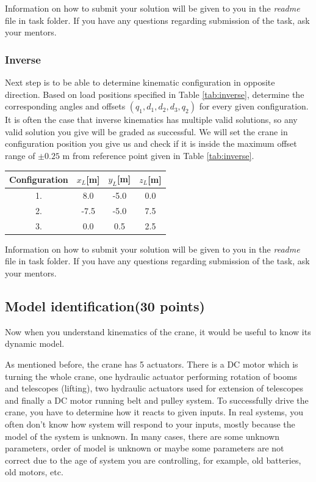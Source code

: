 \documentclass{article}
\begin{document}
	\noindent
	Information on how to submit your solution will be given to you in the \textit{readme} file in task folder. If you have any questions regarding submission of the task, ask your mentors.
	
	\subsubsection{Inverse}
	
	Next step is to be able to determine kinematic configuration in opposite direction. Based on load positions specified in Table \ref{tab:inverse}, determine the corresponding angles and offsets $(q_1, d_1, d_2, d_3, q_2)$ for every given configuration. It is often the case that inverse kinematics has multiple valid solutions, so any valid solution you give will be graded as successful. We will set the crane in configuration position you give us and check if it is inside the maximum offset range of $\pm 0.25$ m from reference point given in Table \ref{tab:inverse}.
	
	\begin{center}
		\label{tab:inverse}
		\begin{tabular}{|| c || c c c ||}
			\hline
			Configuration & $x_L$[m] & $y_L$[m] & $z_L$[m] \\
			\hline\hline
			1. & 8.0 & -5.0 & 0.0\\ 
			\hline
			2. & -7.5 & -5.0 & 7.5 \\
			\hline
			3. & 0.0 & 0.5 & 2.5 \\
			\hline
		\end{tabular}
	\end{center}
	
	\noindent
	Information on how to submit your solution will be given to you in the \textit{readme} file in task folder. If you have any questions regarding submission of the task, ask your mentors.
	
	\subsection{Model identification(30 points)}
	
	Now when you understand kinematics of the crane, it would be useful to know its dynamic model.
	
	As mentioned before, the crane has 5 actuators. There is a DC motor which is turning the whole crane, one hydraulic actuator performing rotation of booms and telescopes (lifting), two hydraulic actuators used for extension of telescopes and finally a DC motor running belt and pulley system. To successfully drive the crane, you have to determine how it reacts to given inputs. In real systems, you often don't know how system will respond to your inputs, mostly because the model of the system is unknown. In many cases, there are some unknown parameters, order of model is unknown or maybe some parameters are not correct due to the age of system you are controlling, for example, old batteries, old motors, etc.
	
\end{document}
